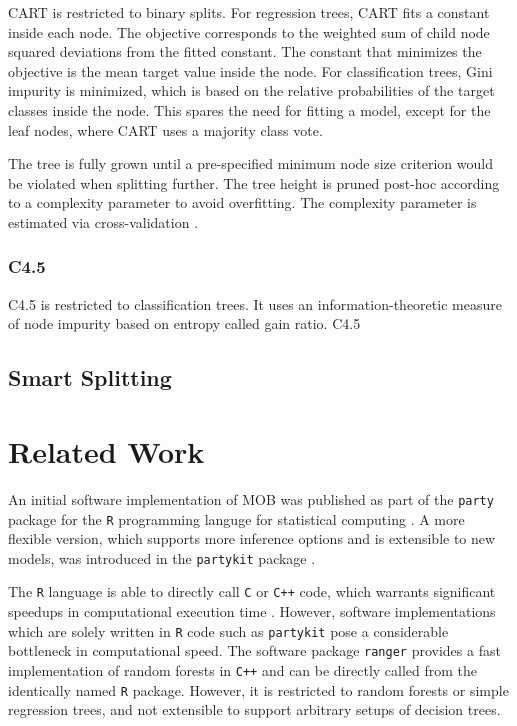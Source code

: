 \documentclass[a4paper, 11pt]{article}
\begin{document}
CART is restricted to binary splits.
For regression trees, CART fits a constant inside each node. The objective corresponds to the weighted sum of child node squared deviations from the fitted constant. The constant that minimizes the objective is the mean target value inside the node.
For classification trees, Gini impurity is minimized, which is based on the relative probabilities of the target classes inside the node. This spares the need for fitting a model, except for the leaf nodes, where CART uses a majority class vote. 
\par
The tree is fully grown until a pre-specified minimum node size criterion would be violated when splitting further. The tree height is pruned post-hoc according to a complexity parameter to avoid overfitting. The complexity parameter is estimated via cross-validation \cite{hastie_elemstatlearn}.

\subsubsection{C4.5}

C4.5 is restricted to classification trees. It uses an information-theoretic measure of node impurity based on entropy called gain ratio. C4.5  



\subsection{Smart Splitting}


\section{Related Work}

An initial software implementation of MOB was published as part of the \texttt{party} package \cite{party_package} for the \texttt{R} programming languge for statistical computing \cite{r_citation}. A more flexible version, which supports more inference options and is extensible to new models, was introduced in the \texttt{partykit} package \cite{partykit_package}. 
\par
The \texttt{R} language is able to directly call \texttt{C} or \texttt{C++} code, which warrants significant speedups in computational execution time \cite{eddelbuettel_rcpp}. However, software implementations which are solely written in \texttt{R} code such as \texttt{partykit} pose a considerable bottleneck in computational speed.
The software package \texttt{ranger} \cite{ranger_package} provides a fast implementation of random forests in \texttt{C++} and can be directly called from the identically named \texttt{R} package. However, it is restricted to random forests or simple regression trees, and not extensible to support arbitrary setups of decision trees.
\end{document}
